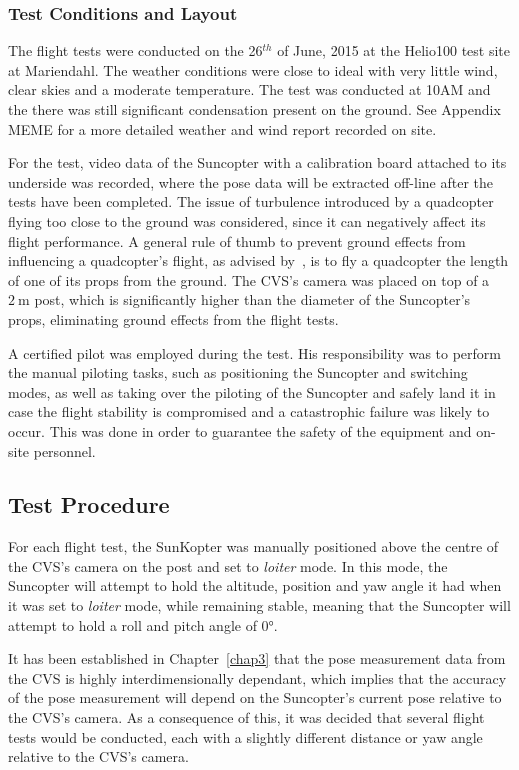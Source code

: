 \subsubsection{Test Conditions and Layout}

The flight tests were conducted on the 26$^{th}$ of June, 2015 at the Helio100 test site at Mariendahl. The weather conditions were close to ideal with very little wind, clear skies and a moderate temperature. The test was conducted at 10AM and the there was still significant condensation present on the ground. See Appendix MEME for a more detailed weather and wind report recorded on site.

For the test, video data of the Suncopter with a calibration board attached to its underside was recorded, where the pose data will be extracted off-line after the tests have been completed. The issue of turbulence introduced by a quadcopter flying too close to the ground was considered, since it can negatively affect its flight performance. A general rule of thumb to prevent ground effects from influencing a quadcopter's flight, as advised by~\cite{basson-flight-test}, is to fly a quadcopter the length of one of its props from the ground. The CVS's camera was placed on top of a $\SI{2}{\m}$ post, which is significantly higher than the diameter of the Suncopter's props, eliminating ground effects from the flight tests.

A certified pilot was employed during the test. His responsibility was to perform the manual piloting tasks, such as positioning the Suncopter and switching modes, as well as taking over the piloting of the Suncopter and safely land it in case the flight stability is compromised and a catastrophic failure was likely to occur. This was done in order to guarantee the safety of the equipment and on-site personnel. 

\subsection{Test Procedure}

For each flight test, the SunKopter was manually positioned above the centre of the CVS's camera on the post and set to \emph{loiter} mode. In this mode, the Suncopter will attempt to hold the altitude, position and yaw angle it had when it was set to \emph{loiter} mode, while remaining stable, meaning that the Suncopter will attempt to hold a roll and pitch angle of $\ang{0}$. 

It has been established in Chapter~\ref{chap3} that the pose measurement data from the CVS is highly interdimensionally dependant, which implies that the accuracy of the pose measurement will depend on the Suncopter's current pose relative to the CVS's camera. As a consequence of this, it was decided that several flight tests would be conducted, each with a slightly different distance or yaw angle relative to the CVS's camera. 

